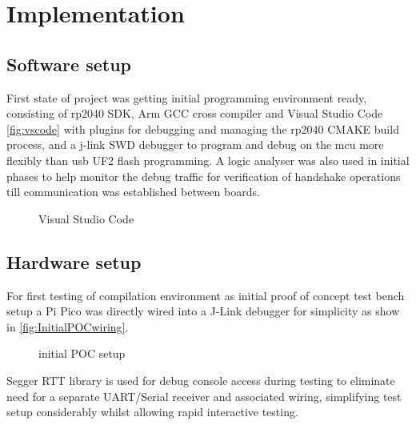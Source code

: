 \clearpage%
\vspace{21.5pt}
\chapter{Implementation}
\section{Software  setup}

First state of project was getting initial programming environment ready, consisting of rp2040 SDK, Arm GCC cross compiler and Visual Studio Code \autoref{fig:vscode} with plugins for debugging and managing the rp2040 CMAKE build process, and a j-link SWD debugger to program and debug on the \gls{mcu} more flexibly than \gls{usb} UF2 flash programming. A logic analyser was also used in initial phases to help monitor the debug traffic for verification of handshake operations till communication was established between boards.

\begin{figure}[ht]
	\centering
	\caption{Visual Studio Code}
	\label{fig:vscode}
\end{figure}

\clearpage
\section{Hardware setup}
%

For first testing of compilation environment as initial proof of concept test bench setup a Pi Pico was directly wired into a J-Link debugger for simplicity as show in \autoref{fig:InitialPOCwiring}.

\begin{figure}[ht]
	\centering
	\caption{initial POC setup}
	\label{fig:InitialPOCwiring}
\end{figure}

Segger RTT library\cite{JLinkRTTReal} is used for debug console access during testing to eliminate need for a separate UART/Serial receiver and associated wiring, simplifying test setup considerably whilst allowing rapid interactive testing. 

